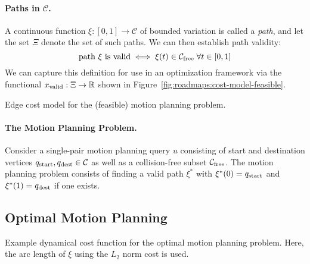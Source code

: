 \paragraph{Paths in $\mathcal{C}$.}
A continuous function $\xi : [0,1] \rightarrow \mathcal{C}$
of bounded variation is called a \emph{path},
and let the set $\Xi$ denote the set of such paths.
We can then establish path validity:
\begin{equation}
   \mbox{path $\xi$ is valid} \iff
   \xi(t) \in \mathcal{C}_{\mbox{\scriptsize free}} \;\forall t \in [0,1]
   \label{eqn:roadmaps:path-validity}
\end{equation}
We can capture this definition for use in an optimization
framework via the functional
$x_{\mbox{\scriptsize valid}} : \Xi \rightarrow \mathbb{R}$
shown in Figure~\ref{fig:roadmaps:cost-model-feasible}.

\begin{marginfigure}
   \centering
   \caption{Edge cost model
      for the (feasible) motion planning problem.}
   \label{fig:roadmaps:cost-model-feasible}
\end{marginfigure}

\paragraph{The Motion Planning Problem.}
Consider a single-pair motion planning query $u$
consisting of start and destination vertices
$q_{\mbox{\scriptsize start}}, q_{\mbox{\scriptsize dest}} \in \mathcal{C}$
as well as a collision-free subset $\mathcal{C}_{\mbox{\scriptsize free}}$.
The motion planning problem consists of finding a valid path $\xi^*$
with $\xi^*(0) = q_{\mbox{\scriptsize start}}$ and $\xi^*(1) = q_{\mbox{\scriptsize dest}}$
if one exists.

\subsection{Optimal Motion Planning}

\begin{marginfigure}
   \centering
   \caption{Example dynamical cost function for the optimal
      motion planning problem.
      Here, the arc length of $\xi$ using the $L_2$ norm cost is used.}
   \label{fig:roadmaps:cost-model-path}
\end{marginfigure}

